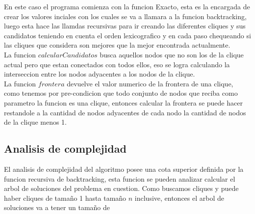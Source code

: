En este caso el programa comienza con la funcion Exacto, esta es la encargada de crear los valores inciales con los cuales se va a llamara a la funcion backtracking, luego esta hace las llamdas recursivas para ir creando las diferentes cliques y sus candidatos teniendo en cuenta el orden lexicografico y en cada paso chequeando si las cliques que considera son mejores que la mejor encontrada actualmente. \\
La funcion $calcularCandidatos$ busca aquellos nodos que no son los de la clique actual pero que estan conectados con todos ellos, eso se logra calculando la interseccion entre los nodos adyacentes a los nodos de la clique. \\
La funcion $frontera$ devuelve el valor numerico de la frontera de una clique, como tenemos por pre-condicion que todo conjunto de nodos que reciba como parametro la funcion es una clique, entonces calcular la frontera se puede hacer restandole a la cantidad de nodos adyacentes de cada nodo la cantidad de nodos de la clique menos 1. 

\subsection{Analisis de complejidad}

El analisis de complejidad del algoritmo posee una cota superior definida por la funcion recursiva de backtracking, esta funcion se pueden analizar calcular el arbol de soluciones del problema en cuestion. Como buscamos cliques y puede haber cliques de tamaño 1 hasta tamaño $n$ inclusive, entonces el arbol de soluciones va a tener un tamaño de 